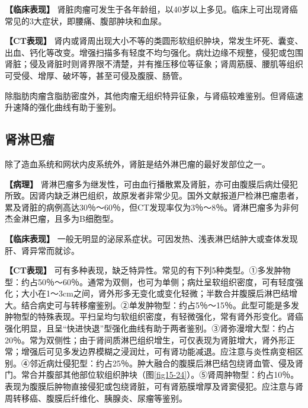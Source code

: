 \textbf{【临床表现】}
肾脏肉瘤可发生于各年龄组，以40岁以上多见。临床上可出现肾癌常见的3大症状，即腰痛、腹部肿块和血尿。

\textbf{【CT表现】}
肾内或肾周出现大小不等的类圆形软组织肿块，常发生坏死、囊变、出血、钙化等改变。增强扫描多有轻度不均匀强化。病灶边缘不规整，侵犯或包围肾脏；侵及肾脏时则肾界限不清楚，并有推压移位等征象；肾周筋膜、腰肌等组织可受侵、增厚、破坏等，甚至可侵及腹膜、肠管。

除脂肪肉瘤含脂肪密度外，其他肉瘤无组织特异征象，与肾癌较难鉴别。但肾癌速升速降的强化曲线有助于鉴别。

\subsection{肾淋巴瘤}

除了造血系统和网状内皮系统外，肾脏是结外淋巴瘤的最好发部位之一。

\textbf{【病理】}
肾淋巴瘤多为继发性，可由血行播散累及肾脏，亦可由腹膜后病灶侵犯所致。因肾内缺乏淋巴组织，故原发者非常少见。国外文献报道尸检淋巴瘤患者，累及肾脏的病例高达30％～60％，但CT发现率仅为3％～8％。肾淋巴瘤多为非何杰金淋巴瘤，且多为B细胞型。

\textbf{【临床表现】}
一般无明显的泌尿系症状。可因发热、浅表淋巴结肿大或查体发现肝、肾异常而就诊。

\textbf{【CT表现】}
可有多种表现，缺乏特异性。常见的有下列5种类型。①多发肿物型：约占50％～60％。通常为双侧，也可为单侧；病灶呈软组织密度，可有轻度强化；大小在1～3cm之间，肾外形多无变化或变化轻微；半数合并腹膜后淋巴结增大。结合病史可与转移瘤鉴别。②单发肿物型：约占5％～15％。此型可能是多发肿物型的特殊表现。平扫呈均匀软组织密度，有轻微强化，常有肾外形变化。肾癌强化明显，且呈“快进快退”型强化曲线有助于两者鉴别。③肾弥漫增大型：约占20％。常为双侧性；由于肾间质淋巴组织增生，可仅表现为肾脏增大，肾外形正常；增强后可见多发边界模糊之浸润灶，可有肾功能减退。应注意与炎性病变相区别。④邻近病灶侵犯型：约占25％。肿大融合的腹膜后淋巴结包绕肾血管、侵及肾门。常合并腹部其他部位软组织肿块（图\ref{fig15-24}）。⑤肾周肿物型：约占10％。表现为腹膜后肿物直接侵犯或包绕肾脏，可有肾筋膜增厚及肾窦侵犯。应注意与肾周转移癌、腹膜后纤维化、胰腺炎、尿瘤等鉴别。

